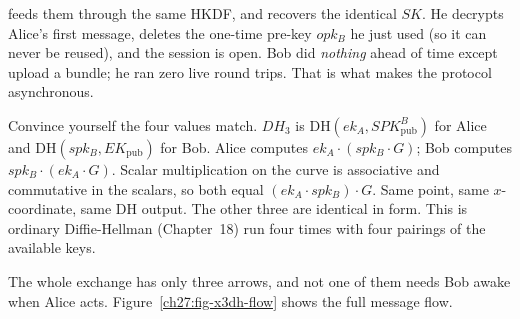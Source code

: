 feeds them through the same HKDF, and recovers the identical $SK$. He decrypts Alice's first message, deletes the one-time pre-key $opk_B$ he just used (so it can never be reused), and the session is open. Bob did \emph{nothing} ahead of time except upload a bundle; he ran zero live round trips. That is what makes the protocol asynchronous.

\begin{walkbox}
Convince yourself the four values match. $DH_3$ is $\mathrm{DH}(ek_A, SPK_{\mathrm{pub}}^B)$ for Alice and $\mathrm{DH}(spk_B, EK_{\mathrm{pub}})$ for Bob. Alice computes $ek_A \cdot (spk_B \cdot G)$; Bob computes $spk_B \cdot (ek_A \cdot G)$. Scalar multiplication on the curve is associative and commutative in the scalars, so both equal $(ek_A \cdot spk_B)\cdot G$. Same point, same $x$-coordinate, same DH output. The other three are identical in form. This is ordinary Diffie-Hellman (Chapter~18) run four times with four pairings of the available keys.
\end{walkbox}

The whole exchange has only three arrows, and not one of them needs Bob awake when Alice acts. Figure~\ref{ch27:fig-x3dh-flow} shows the full message flow.

